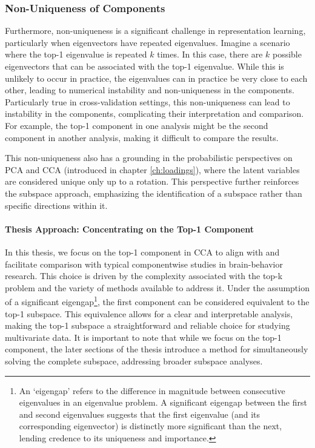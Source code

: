 \subsubsection{Non-Uniqueness of Components}

Furthermore, non-uniqueness is a significant challenge in representation learning, particularly when eigenvectors have repeated eigenvalues. Imagine a scenario where the top-1 eigenvalue is repeated \(k\) times. In this case, there are \(k\) possible eigenvectors that can be associated with the top-1 eigenvalue. While this is unlikely to occur in practice, the eigenvalues can in practice be very close to each other, leading to numerical instability and non-uniqueness in the components. Particularly true in cross-validation settings, this non-uniqueness can lead to instability in the components, complicating their interpretation and comparison.
For example, the top-1 component in one analysis might be the second component in another analysis, making it difficult to compare the results.

This non-uniqueness also has a grounding in the probabilistic perspectives on PCA and CCA (introduced in chapter \ref{ch:loadings}), where the latent variables are considered unique only up to a rotation.
This perspective further reinforces the subspace approach, emphasizing the identification of a subspace rather than specific directions within it.

\paragraph{Thesis Approach: Concentrating on the Top-1 Component}

In this thesis, we focus on the top-1 component in CCA to align with and facilitate comparison with typical componentwise studies in brain-behavior research.
This choice is driven by the complexity associated with the top-k problem and the variety of methods available to address it.
Under the assumption of a significant eigengap\footnote{An `eigengap' refers to the difference in magnitude between consecutive eigenvalues in an eigenvalue problem. A significant eigengap between the first and second eigenvalues suggests that the first eigenvalue (and its corresponding eigenvector) is distinctly more significant than the next, lending credence to its uniqueness and importance.}, the first component can be considered equivalent to the top-1 subspace.
This equivalence allows for a clear and interpretable analysis, making the top-1 subspace a straightforward and reliable choice for studying multivariate data.
It is important to note that while we focus on the top-1 component, the later sections of the thesis introduce a method for simultaneously solving the complete subspace, addressing broader subspace analyses.


